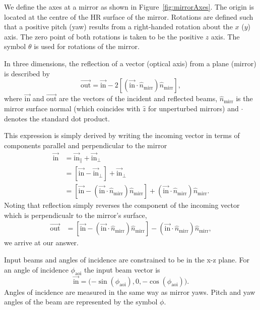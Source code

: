 \documentclass[12pt]{article}
\newcommand{\threeVec}[3]{\big( {#1}, {#2}, {#3} \big)}
\newcommand{\myVec}[1]{\vec{#1}}
\begin{document}
We define the axes at a mirror as shown in
Figure~\ref{fig:mirrorAxes}. The origin is located at the centre of
the HR surface of the mirror. Rotations are defined such that a
positive pitch (yaw) results from a right-handed rotation about the
$x$ ($y$) axis. The zero point of both rotations is taken to be the
positive $z$ axis. The symbol $\theta$ is used for rotations of the
mirror.

In three dimensions, the reflection of a vector (optical axis) from a
plane (mirror) is described by
\begin{equation}
  \label{eq:vectorReflection}
  \myVec{\mathrm{out}} = \myVec{\mathrm{in}}-2\left[(\myVec{\mathrm{in}}\cdot \hat{n}_\mathrm{mirr})\hat{n}_\mathrm{mirr}\right],
\end{equation}
where $\myVec{\mathrm{in}}$ and $\myVec{\mathrm{out}}$ are the vectors
of the incident and reflected beams, $\hat{n}_\mathrm{mirr}$ is the mirror
surface normal (which coincides with $\hat{z}$ for unperturbed
mirrors) and $\cdot$ denotes the standard dot product.

This expression is simply derived by writing the incoming vector in
terms of components parallel and perpendicular to the mirror
\begin{align}
  \myVec{\mathrm{in}}&=\myVec{\mathrm{in}}_\parallel+\myVec{\mathrm{in}}_\perp\\
  &= [\myVec{\mathrm{in}}-\myVec{\mathrm{in}}_\perp]+\myVec{\mathrm{in}}_\perp\\
  &= \left[\myVec{\mathrm{in}}-(\myVec{\mathrm{in}}\cdot \hat{n}_\mathrm{mirr})\hat{n}_\mathrm{mirr}\right]+(\myVec{\mathrm{in}}\cdot \hat{n}_\mathrm{mirr})\hat{n}_\mathrm{mirr}.
\end{align}
Noting that reflection simply reverses the component of the incoming
vector which is perpendicualr to the mirror's surface,
\begin{align}
  \myVec{\mathrm{out}}&= \left[\myVec{\mathrm{in}}-(\myVec{\mathrm{in}}\cdot \hat{n}_\mathrm{mirr})\hat{n}_\mathrm{mirr}\right]-(\myVec{\mathrm{in}}\cdot \hat{n}_\mathrm{mirr})\hat{n}_\mathrm{mirr},
\end{align}
we arrive at our answer.

Input beams and angles of incidence are constrained to be in the x-z
plane. For an angle of incidence $\phi_\mathrm{aoi}$ the input beam vector is
\begin{equation}
  \label{eq:inVec}
  \myVec{\mathrm{in}}=\threeVec{-\sin(\phi_\mathrm{aoi})}{0}{-\cos(\phi_\mathrm{aoi})}.
\end{equation}
Angles of incidence are measured in the same way as mirror yaws. Pitch
and yaw angles of the beam are represented by the symbol $\phi$.
\end{document}
